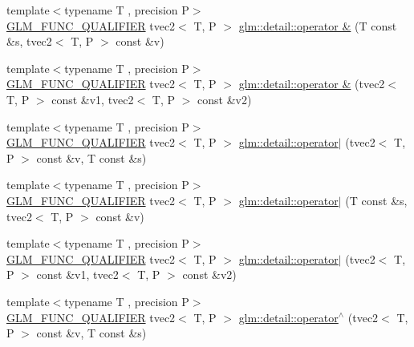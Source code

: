 \begin{DoxyCompactItemize}
\item 
{\footnotesize template$<$typename T , precision P$>$ }\\\hyperlink{setup_8hpp_a33fdea6f91c5f834105f7415e2a64407}{G\+L\+M\+\_\+\+F\+U\+N\+C\+\_\+\+Q\+U\+A\+L\+I\+F\+I\+ER} tvec2$<$ T, P $>$ \hyperlink{namespaceglm_1_1detail_a8622322f14f0fec99d90e9f14cdc58c6}{glm\+::detail\+::operator \&} (T const \&s, tvec2$<$ T, P $>$ const \&v)
\item 
{\footnotesize template$<$typename T , precision P$>$ }\\\hyperlink{setup_8hpp_a33fdea6f91c5f834105f7415e2a64407}{G\+L\+M\+\_\+\+F\+U\+N\+C\+\_\+\+Q\+U\+A\+L\+I\+F\+I\+ER} tvec2$<$ T, P $>$ \hyperlink{namespaceglm_1_1detail_a5884a412c098d27aef46048cd27863e3}{glm\+::detail\+::operator \&} (tvec2$<$ T, P $>$ const \&v1, tvec2$<$ T, P $>$ const \&v2)
\item 
{\footnotesize template$<$typename T , precision P$>$ }\\\hyperlink{setup_8hpp_a33fdea6f91c5f834105f7415e2a64407}{G\+L\+M\+\_\+\+F\+U\+N\+C\+\_\+\+Q\+U\+A\+L\+I\+F\+I\+ER} tvec2$<$ T, P $>$ \hyperlink{namespaceglm_1_1detail_ac04a0c5dad5e8d83558a246cff154118}{glm\+::detail\+::operator$\vert$} (tvec2$<$ T, P $>$ const \&v, T const \&s)
\item 
{\footnotesize template$<$typename T , precision P$>$ }\\\hyperlink{setup_8hpp_a33fdea6f91c5f834105f7415e2a64407}{G\+L\+M\+\_\+\+F\+U\+N\+C\+\_\+\+Q\+U\+A\+L\+I\+F\+I\+ER} tvec2$<$ T, P $>$ \hyperlink{namespaceglm_1_1detail_acd4a9d33d45d32b182d2634aa2561a4c}{glm\+::detail\+::operator$\vert$} (T const \&s, tvec2$<$ T, P $>$ const \&v)
\item 
{\footnotesize template$<$typename T , precision P$>$ }\\\hyperlink{setup_8hpp_a33fdea6f91c5f834105f7415e2a64407}{G\+L\+M\+\_\+\+F\+U\+N\+C\+\_\+\+Q\+U\+A\+L\+I\+F\+I\+ER} tvec2$<$ T, P $>$ \hyperlink{namespaceglm_1_1detail_a82d882137e1fe72634b4eda4538ec15a}{glm\+::detail\+::operator$\vert$} (tvec2$<$ T, P $>$ const \&v1, tvec2$<$ T, P $>$ const \&v2)
\item 
{\footnotesize template$<$typename T , precision P$>$ }\\\hyperlink{setup_8hpp_a33fdea6f91c5f834105f7415e2a64407}{G\+L\+M\+\_\+\+F\+U\+N\+C\+\_\+\+Q\+U\+A\+L\+I\+F\+I\+ER} tvec2$<$ T, P $>$ \hyperlink{namespaceglm_1_1detail_a4cebf0aac1beea93d94d0bf2c5efed6a}{glm\+::detail\+::operator$^\wedge$} (tvec2$<$ T, P $>$ const \&v, T const \&s)
\item 

\end{DoxyCompactItemize}

